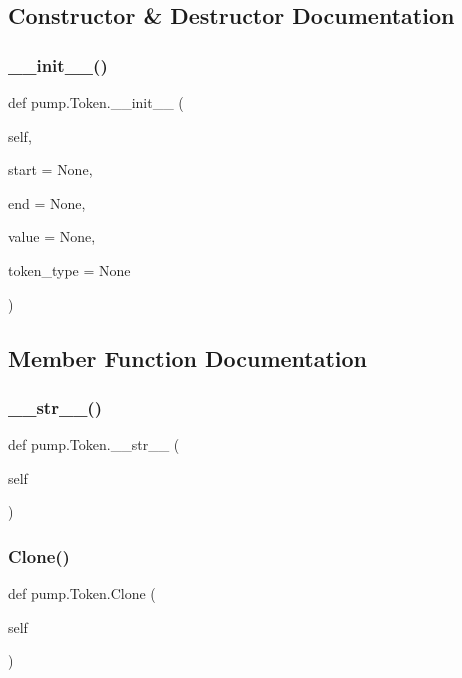 \subsection{Constructor \& Destructor Documentation}
\mbox{\label{classpump_1_1_token_a55e6843fd724dc3771861372d5116f48}} 
\subsubsection{\texorpdfstring{\_\_init\_\_()}{\_\_init\_\_()}}
{\footnotesize\ttfamily def pump.\+Token.\+\_\+\+\_\+init\+\_\+\+\_\+ (\begin{DoxyParamCaption}\item[{}]{self,  }\item[{}]{start = {\ttfamily None},  }\item[{}]{end = {\ttfamily None},  }\item[{}]{value = {\ttfamily None},  }\item[{}]{token\+\_\+type = {\ttfamily None} }\end{DoxyParamCaption})}



\subsection{Member Function Documentation}
\mbox{\label{classpump_1_1_token_ad0079ae4449d89bc2d5756488099cb33}} 
\subsubsection{\texorpdfstring{\_\_str\_\_()}{\_\_str\_\_()}}
{\footnotesize\ttfamily def pump.\+Token.\+\_\+\+\_\+str\+\_\+\+\_\+ (\begin{DoxyParamCaption}\item[{}]{self }\end{DoxyParamCaption})}

\mbox{\label{classpump_1_1_token_abc0f2d2a0bcad953f5fc85a4e52076eb}} 
\subsubsection{\texorpdfstring{Clone()}{Clone()}}
{\footnotesize\ttfamily def pump.\+Token.\+Clone (\begin{DoxyParamCaption}\item[{}]{self }\end{DoxyParamCaption})}

